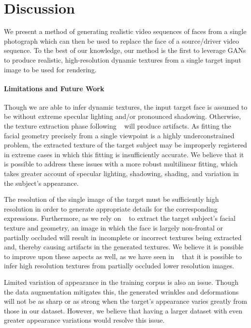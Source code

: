 
\section{Discussion}

We present a method of generating realistic video sequences of faces from a single photograph 
which can then be used to replace the face of a source/driver video sequence. 
To the best of our knowledge, our method is the first
to leverage GANs to produce realistic, high-resolution dynamic textures from a single target input image to be used for rendering.  

\paragraph{Limitations and Future Work}
Though we are able to infer dynamic textures, the input target face is assumed to be without extreme specular lighting and/or pronounced shadowing. Otherwise, the texture extraction phase following ~\cite{f2f} will produce artifacts. As fitting the facial geometry precisely from a single viewpoint is a highly underconstrained problem, the extracted texture of the target subject may be improperly registered in extreme cases in which this fitting is insufficiently accurate. We believe that it is possible to address these issues with a more robust multilinear fitting, which takes greater account of specular lighting, shadowing, shading, and variation in the subject's appearance.

The resolution of the single image of the target must be sufficiently high resolution in order to generate appropriate details for the corresponding expressions. Furthermore, as we rely on ~\cite{f2f} to extract the target subject's facial texture and geometry, an image in which the face is largely non-frontal or partially occluded will result in incomplete or incorrect textures being extracted and, thereby causing artifacts in the generated textures.  We believe it is possible to improve upon these aspects as well, as we have seen in ~\cite{saito2016} that it is possible to infer high resolution textures from partially occluded lower resolution images.  

Limited variation of appearance in the training corpus is also an issue.  Though the data augmentation mitigates this, the generated wrinkles and deformations will not be as sharp or as strong when the target's appearance varies greatly from those in our dataset.  However, we believe that having a larger dataset with even greater appearance variations would resolve this issue.
